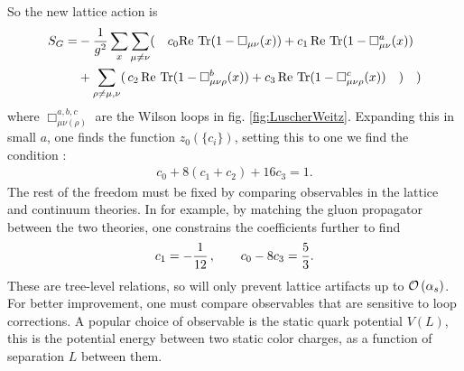 So the new lattice action is
\begin{align}
  \nonumber
  S_G =& - {1\over g^2} \sum_x \sum_{\mu\neq \nu}(\quad c_0 \text{Re Tr} (1-\Box_{\mu\nu}(x)) + c_1 \,\text{Re Tr} (1 - \Box^a_{\mu\nu}(x)) \\
  & + \sum_{\rho\neq \mu,\nu}( \,c_2\, \text{Re Tr} (1 - \Box^b_{\mu\nu\rho}(x)) + c_3 \, \text{Re Tr} (1 - \Box^c_{\mu\nu\rho}(x))\quad)\quad)
\end{align}
where $\Box^{a,b,c}_{\mu\nu(\rho)}$ are the Wilson loops in fig. \ref{fig:LuscherWeitz}. Expanding this in small $a$, one finds the function $z_0(\{c_i\})$, setting this to one we find the condition \cite{WEISZ19831}:
\begin{align}
  c_0 + 8 (c_1 + c_2) + 16 c_3 = 1.
\end{align}
The rest of the freedom must be fixed by comparing observables in the lattice and continuum theories. In \cite{WEISZ1984397} for example, by matching the gluon propagator between the two theories, one constrains the coefficients further to find
\begin{align}
  c_1 = -{1\over 12} \,,\quad\quad
  c_0 - 8c_3 = {5\over 3}.
\end{align}
These are tree-level relations, so will only prevent lattice artifacts up to $\mathcal{O}\left( \alpha_s \right)$. For better improvement, one must compare observables that are sensitive to loop corrections. A popular choice of observable is the static quark potential $V(L)$, this is the potential energy between two static color charges, as a function of separation $L$ between them.

